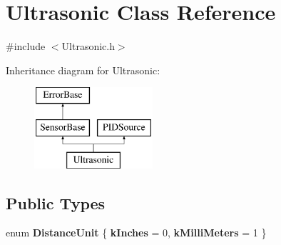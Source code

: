\hypertarget{classUltrasonic}{
\section{Ultrasonic Class Reference}
\label{classUltrasonic}
}


{\ttfamily \#include $<$Ultrasonic.h$>$}

Inheritance diagram for Ultrasonic:\begin{figure}[H]
\begin{center}
\leavevmode
\includegraphics[height=3.000000cm]{classUltrasonic}
\end{center}
\end{figure}
\subsection*{Public Types}
\begin{DoxyCompactItemize}
\item 
enum {\bfseries DistanceUnit} \{ {\bfseries kInches} =  0, 
{\bfseries kMilliMeters} =  1
 \}
\end{DoxyCompactItemize}
